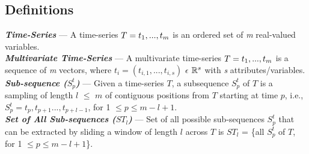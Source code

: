 \documentclass[conference]{IEEEtran}  %
\begin{document}
\subsection{Definitions}
\noindent
\textbf{\textit{Time-Series}} --- A time-series $T = t\textsubscript{1},..., t_m$ is an ordered set of \textit{m} real-valued variables.
\smallskip\\
\textbf{\textit{Multivariate Time-Series}} --- A multivariate time-series $T = t\textsubscript{1}, . . . , t_m$ is a sequence of \textit{m} vectors, where $t_i = (t_{i,1}, . . . , t_{i,s})$ $\epsilon$ $\mathbb{R}\textsuperscript{\(s\)}$ with \textit{s} attributes/variables.
\smallskip\\
\textbf{\textit{Sub-sequence ($S^t_p$)}} --- Given a time-series $T$, a subsequence $S^t_p$ of $T$ is a sampling of length $l$ \(\leq\) $m$ of contiguous positions from $T$ starting at time $p$, i.e., $S^t_p = t_p, t_{p+1}...,t_{p+l-1}$, for 1 \(\leq p \leq m - l + 1\).
\smallskip\\
\textbf{\textit{Set of All Sub-sequences ($ST_l$)}} --- Set of all possible sub-sequences $S^t_p$ that can be extracted by sliding a window of length $l$ across $T$ is $ST_l$ = \{all $S^t_p$ of $T$,  for 1 \(\leq p \leq m - l + 1\)\}.
\end{document}
